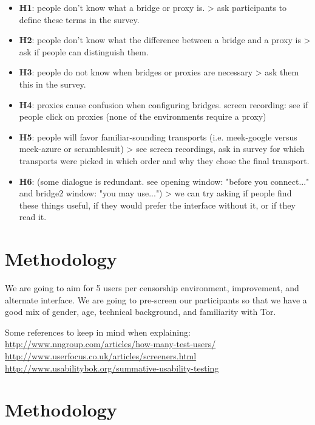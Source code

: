 \documentclass{template}
\begin{document}
\begin{itemize} \itemsep1pt \parskip0pt 
\item  {\bfseries H1}: people don't know what a bridge or proxy is. > ask participants to define these terms in the survey.  
\item  {\bfseries H2}: people don't know what the difference between a bridge and a proxy is > ask if people can distinguish them. 
\item  {\bfseries H3}: people do not know when bridges or proxies are necessary > ask them this in the survey.  
\item  {\bfseries H4}: proxies cause confusion when configuring bridges. screen recording: see if people click on proxies (none of the environments require a proxy)
\item  {\bfseries H5}: people will favor familiar-sounding transports (i.e. meek-google versus meek-azure or scramblesuit) > see screen recordings, ask in survey for which transports were picked in which order and why they chose the final transport.  
\item {\bfseries H6}: (some dialogue is redundant. see opening window: "before you connect..." and bridge2 window: "you may use...") > we can try asking if people find these things useful, if they would prefer the interface without it, or if they read it.  
\end{itemize} 

\section{Methodology} 

We are going to aim for 5 users per censorship environment, improvement, 
and alternate interface. We are going to pre-screen our participants so that 
we have a good mix of gender, age, technical background, and familiarity 
with Tor. 

Some references to keep in mind when explaining: 
\href{why 5 users}{http://www.nngroup.com/articles/how-many-test-users/}
\href{screening}{http://www.userfocus.co.uk/articles/screeners.html}
\href{summative and usability mixed model}{http://www.usabilitybok.org/summative-usability-testing}

\section{Methodology}
\end{document}
